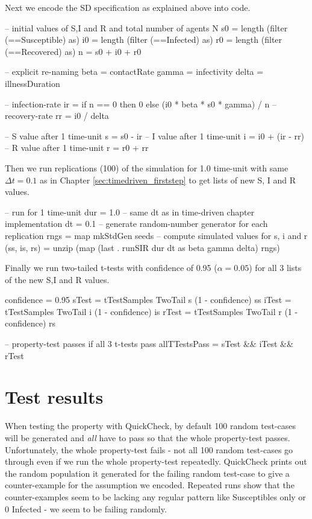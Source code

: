 Next we encode the SD specification as explained above into code.

\begin{HaskellCode}
-- initial values of S,I and R and total number of agents N
s0 = length (filter (==Susceptible) as)
i0 = length (filter (==Infected) as)
r0 = length (filter (==Recovered) as)
n  = s0 + i0 + r0

-- explicit re-naming
beta  = contactRate
gamma = infectivity
delta = illnessDuration

-- infection-rate
ir = if n == 0 then 0 else (i0 * beta * s0 * gamma) / n
-- recovery-rate 
rr = i0 / delta

-- S value after 1 time-unit 
s = s0 - ir
-- I value after 1 time-unit
i = i0 + (ir - rr)
-- R value after 1 time-unit
r = r0 + rr
\end{HaskellCode}

Then we run replications (100) of the simulation for 1.0 time-unit with same $\Delta t = 0.1$ as in Chapter \ref{sec:timedriven_firststep} to get lists of new S, I and R values.

\begin{HaskellCode}
-- run for 1 time-unit
dur = 1.0
-- same dt as in time-driven chapter implementation
dt = 0.1
-- generate random-number generator for each replication
rngs = map mkStdGen seeds
-- compute simulated values for s, i and r
(ss, is, rs) = unzip (map (last . runSIR dur dt as beta gamma delta) rngs)
\end{HaskellCode}

Finally we run two-tailed t-tests with confidence of 0.95 ($\alpha = 0.05$) for all 3 lists of the new S,I and R values.

\begin{HaskellCode}
confidence = 0.95
sTest = tTestSamples TwoTail s (1 - confidence) ss
iTest = tTestSamples TwoTail i (1 - confidence) is
rTest = tTestSamples TwoTail r (1 - confidence) rs

-- property-test passes if all 3 t-tests pass
allTTestsPass = sTest && iTest && rTest
\end{HaskellCode}

\section{Test results}
When testing the property with QuickCheck, by default 100 random test-cases will be generated and \textit{all} have to pass so that the whole property-test passes. Unfortunately, the whole property-test fails - not all 100 random test-cases go through even if we run the whole property-test repeatedly. QuickCheck prints out the random population it generated for the failing random test-case to give a counter-example for the assumption we encoded. Repeated runs show that the counter-examples seem to be lacking any regular pattern like Susceptibles only or 0 Infected - we seem to be failing randomly.

